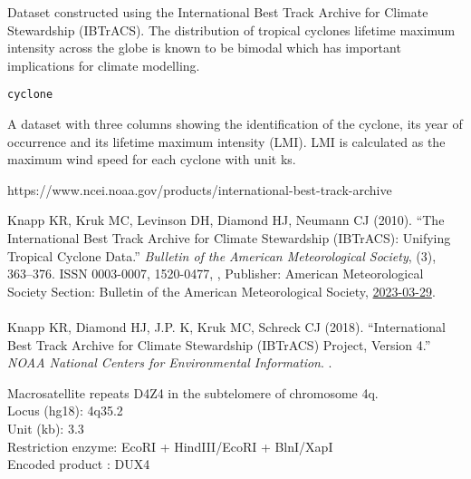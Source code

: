 \documentclass[a4paper]{book}
\begin{document}
%
\begin{Description}\relax
Dataset constructed using the International Best Track Archive for Climate Stewardship (IBTrACS).
The distribution of tropical cyclones lifetime maximum intensity across the globe is known
to be bimodal which has important implications for climate modelling.
\end{Description}
%
\begin{Usage}
\begin{verbatim}
cyclone
\end{verbatim}
\end{Usage}
%
\begin{Format}
A dataset with three columns showing the identification of the cyclone, its year of occurrence and its lifetime maximum intensity (LMI).
LMI is calculated as the maximum wind speed for each cyclone with unit ks.
\end{Format}
%
\begin{Source}\relax
https://www.ncei.noaa.gov/products/international-best-track-archive
\end{Source}
%
\begin{References}\relax
Knapp KR, Kruk MC, Levinson DH, Diamond HJ, Neumann CJ (2010).
``The International Best Track Archive for Climate Stewardship (IBTrACS): Unifying Tropical Cyclone Data.''
\emph{Bulletin of the American Meteorological Society}, (3), 363--376.
ISSN 0003-0007, 1520-0477, , Publisher: American Meteorological Society Section: Bulletin of the American Meteorological Society, \url{2023-03-29}.\\{}\\{}
Knapp KR, Diamond HJ, J.P. K, Kruk MC, Schreck CJ (2018).
``International Best Track Archive for Climate Stewardship (IBTrACS) Project, Version 4.''
\emph{NOAA National Centers for Environmental Information}.
.
\end{References}
%
\begin{Description}\relax
Macrosatellite repeats D4Z4 in the subtelomere of chromosome 4q.\\{}
Locus (hg18): 4q35.2 \\{}
Unit (kb): 3.3 \\{}
Restriction enzyme: EcoRI + HindIII/EcoRI + BlnI/XapI \\{}
Encoded product : DUX4
\end{Description}
\end{document}
